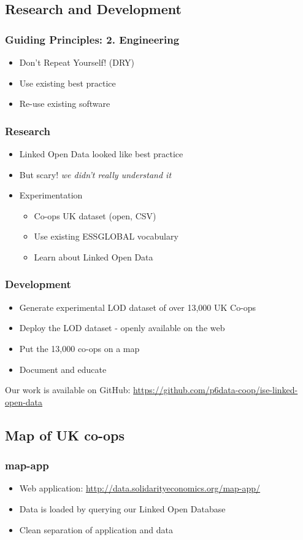 \subsection{Research and Development}
\frame
{
  \frametitle{Guiding Principles: 2. Engineering}
  \begin{itemize}
    \item Don't Repeat Yourself! (DRY)
    \item Use existing best practice
    \item Re-use existing software
  \end{itemize}
}
\frame
{
  \frametitle{Research}
  \begin{itemize}
    \item Linked Open Data looked like best practice
    \item But scary! {\em we didn't really understand it}
    \item Experimentation
      \begin{itemize}
	\item Co-ops UK dataset (open, CSV)
	\item Use existing ESSGLOBAL vocabulary
	\item Learn about Linked Open Data
      \end{itemize}
  \end{itemize}
}
\frame
{
  \frametitle{Development}
  \begin{itemize}
    \item Generate experimental LOD dataset of over 13,000 UK Co-ops
    \item Deploy the LOD dataset - openly available on the web
    \item Put the 13,000 co-ops on a map
    \item Document and educate
  \end{itemize}
}
Our work is available on GitHub: \url{https://github.com/p6data-coop/ise-linked-open-data}
\subsection{Map of UK co-ops}
\frame
{
  \frametitle{map-app}
  \begin{itemize}
    \item Web application: \url{http://data.solidarityeconomics.org/map-app/}
    \item Data is loaded by querying our Linked Open Database
    \item Clean separation of application and data
  \end{itemize}
}

